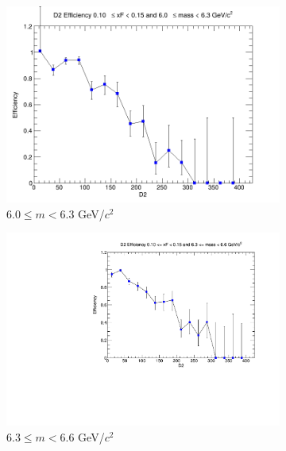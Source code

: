 \begin{figure}[p]
\begin{subfigure}[b]{0.32\textwidth}
        \includegraphics[width=\textwidth]{./kTrackerEfficiencyPlots/D2_Efficiency_xF2_mass6.png}
        \caption{$6.0 \leq m < 6.3$ GeV/$c^2$}
        \label{fig:xF2_mass6}
    \end{subfigure}
    \hfill
    \begin{subfigure}[b]{0.32\textwidth}
        \centering
        \includegraphics[width=\textwidth]{./kTrackerEfficiencyPlots/D2_Efficiency_xF2_mass7.pdf}
        \caption{$6.3 \leq m < 6.6$ GeV/$c^2$}
        \label{fig:xF2_mass7}
    \end{subfigure}
    \hfill
    \begin{subfigure}[b]{0.32\textwidth}
        \centering

\end{subfigure}
\end{figure}

